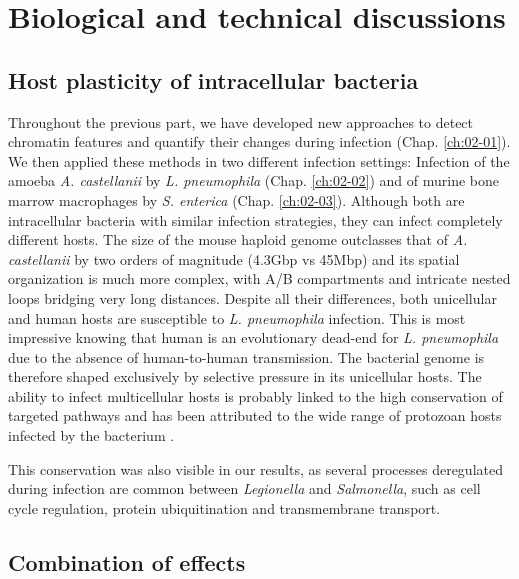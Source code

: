
\chapter{Biological and technical discussions} %
\label{ch:03-01} %

\section{Host plasticity of intracellular bacteria}

Throughout the previous part, we have developed new approaches to detect chromatin features and quantify their changes during infection (Chap. \ref{ch:02-01}). We then applied these methods in two different infection settings: Infection of the amoeba \textit{A. castellanii} by \textit{L. pneumophila} (Chap. \ref{ch:02-02}) and of murine bone marrow macrophages by \textit{S. enterica} (Chap. \ref{ch:02-03}). Although both are intracellular bacteria with similar infection strategies, they can infect completely different hosts. The size of the mouse haploid genome outclasses that of \textit{A. castellanii} by two orders of magnitude (4.3Gbp vs 45Mbp) and its spatial organization is much more complex, with A/B compartments and intricate nested loops bridging very long distances. Despite all their differences, both unicellular and human hosts are susceptible to \textit{L. pneumophila} infection. This is most impressive knowing that human is an evolutionary dead-end for \textit{L. pneumophila} due to the absence of human-to-human transmission. The bacterial genome is therefore shaped exclusively by selective pressure in its unicellular hosts. The ability to infect multicellular hosts is probably linked to the high conservation of targeted pathways and has been attributed to the wide range of protozoan hosts infected by the bacterium \cite{molofskyDifferentiateThriveLessons2004}.

This conservation was also visible in our results, as several processes deregulated during infection are common between \textit{Legionella} and \textit{Salmonella}, such as cell cycle regulation, protein ubiquitination and transmembrane transport.


\section{Combination of effects}

